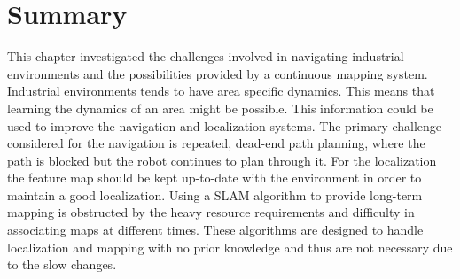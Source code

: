 \section{Summary}
This chapter investigated the challenges involved in navigating industrial environments and the possibilities provided by a continuous mapping system. 
Industrial environments tends to have area specific dynamics. This means that learning the dynamics of an area might be possible. This information could be used to improve the navigation and localization systems.
The primary challenge considered for the navigation is repeated, dead-end path planning, where the path is blocked but the robot continues to plan through it.
For the localization the feature map should be kept up-to-date with the environment in order to maintain a good localization. 
Using a SLAM algorithm to provide long-term mapping is obstructed by the heavy resource requirements and difficulty in associating maps at different times. These algorithms are designed to handle localization and mapping with no prior knowledge and thus are not necessary due to the slow changes.  